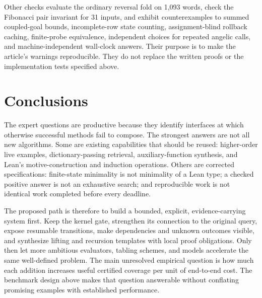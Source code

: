 Other checks evaluate the ordinary reversal fold on 1,093 words, check the
Fibonacci pair invariant for 31 inputs, and exhibit counterexamples to
summed coupled-goal bounds, incomplete-row state counting, assignment-blind
rollback caching, finite-probe equivalence, independent choices for repeated
angelic calls, and machine-independent wall-clock answers. Their purpose is
to make the article's warnings reproducible. They do not replace the written
proofs or the implementation tests specified above.

\section{Conclusions}

The expert questions are productive because they identify interfaces at which
otherwise successful methods fail to compose. The strongest answers are not
all new algorithms. Some are existing capabilities that should be reused:
higher-order live examples, dictionary-passing retrieval, auxiliary-function
synthesis, and Lean's motive-construction and induction operations. Others
are corrected specifications: finite-state minimality is not minimality of a
Lean type; a checked positive answer is not an exhaustive search; and
reproducible work is not identical work completed before every deadline.

The proposed path is therefore to build a bounded, explicit, evidence-carrying
system first. Keep the kernel gate, strengthen its connection to the original
query, expose resumable transitions, make dependencies and unknown outcomes
visible, and synthesize lifting and recursion templates with local proof
obligations. Only then let more ambitious evaluators, tabling schemes, and
models accelerate the same well-defined problem. The main unresolved
empirical question is how much each addition increases useful certified
coverage per unit of end-to-end cost. The benchmark design above makes that
question answerable without conflating promising examples with established
performance.

